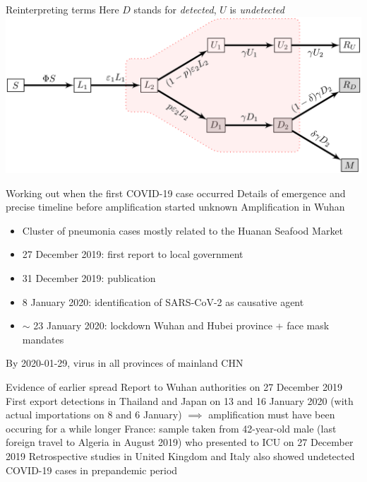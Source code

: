 \documentclass[aspectratio=169]{beamer}\usepackage[]{graphicx}\usepackage[]{xcolor}
\begin{document}
\begin{frame}{Reinterpreting terms}
Here $D$ stands for \emph{detected}, $U$ is \emph{undetected}
\vfill
\centering
\includegraphics[width=\textwidth]{FIGS/figure_SLDURM_base_model_with_different_epsilon_and_infectious_compartments}
\end{frame}

\begin{frame}{Working out when the first COVID-19 case occurred}
\bbullet Details of emergence and precise timeline before amplification started unknown
\vfill
\bbullet Amplification in Wuhan
\begin{itemize}
\item Cluster of pneumonia cases mostly related to the Huanan Seafood Market
\item 27 December 2019: first report to local government
\item 31 December 2019: publication
\item 8 January 2020: identification of SARS-CoV-2 as causative agent
\item $\sim$ 23 January 2020: lockdown Wuhan and Hubei province + face mask mandates
\end{itemize}
\vfill
\bbullet By 2020-01-29, virus in all provinces of mainland CHN
\end{frame}


\begin{frame}{Evidence of earlier spread}
\bbullet Report to Wuhan authorities on 27 December 2019
\vfill
\bbullet First export detections in Thailand and Japan on 13 and 16 January 2020 (with actual importations on 8 and 6 January)
\vfill
$\implies$ amplification must have been occuring for a while longer
\vfill
\bbullet France: sample taken from 42-year-old male (last foreign travel to Algeria in August 2019) who presented to ICU on 27 December 2019
\vfill
\bbullet Retrospective studies in United Kingdom and Italy also showed undetected COVID-19 cases in prepandemic period
\end{frame}
\end{document}
